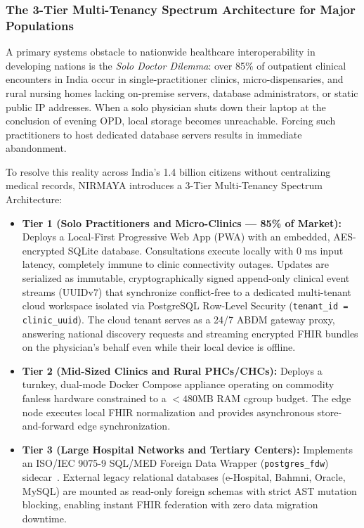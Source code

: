 \documentclass[journal,twocolumn]{IEEEtran}
\begin{document}
\subsubsection{The 3-Tier Multi-Tenancy Spectrum Architecture for Major Populations}
A primary systems obstacle to nationwide healthcare interoperability in developing nations is the \emph{Solo Doctor Dilemma}: over 85\% of outpatient clinical encounters in India occur in single-practitioner clinics, micro-dispensaries, and rural nursing homes lacking on-premise servers, database administrators, or static public IP addresses. When a solo physician shuts down their laptop at the conclusion of evening OPD, local storage becomes unreachable. Forcing such practitioners to host dedicated database servers results in immediate abandonment.

To resolve this reality across India's 1.4 billion citizens without centralizing medical records, NIRMAYA introduces a 3-Tier Multi-Tenancy Spectrum Architecture:
\begin{itemize}
    \item \textbf{Tier 1 (Solo Practitioners and Micro-Clinics --- 85\% of Market):} Deploys a Local-First Progressive Web App (PWA) with an embedded, AES-encrypted SQLite database. Consultations execute locally with $0\text{ ms}$ input latency, completely immune to clinic connectivity outages. Updates are serialized as immutable, cryptographically signed append-only clinical event streams (UUIDv7) that synchronize conflict-free to a dedicated multi-tenant cloud workspace isolated via PostgreSQL Row-Level Security (\texttt{tenant\_id = clinic\_uuid}). The cloud tenant serves as a 24/7 ABDM gateway proxy, answering national discovery requests and streaming encrypted FHIR bundles on the physician's behalf even while their local device is offline.
    \item \textbf{Tier 2 (Mid-Sized Clinics and Rural PHCs/CHCs):} Deploys a turnkey, dual-mode Docker Compose appliance operating on commodity fanless hardware constrained to a $< 480\text{MB}$ RAM cgroup budget. The edge node executes local FHIR normalization and provides asynchronous store-and-forward edge synchronization.
    \item \textbf{Tier 3 (Large Hospital Networks and Tertiary Centers):} Implements an ISO/IEC 9075-9 SQL/MED Foreign Data Wrapper (\texttt{postgres\_fdw}) sidecar~\cite{iso_sql_med}. External legacy relational databases (e-Hospital, Bahmni, Oracle, MySQL) are mounted as read-only foreign schemas with strict AST mutation blocking, enabling instant FHIR federation with zero data migration downtime.
\end{itemize}
\end{document}
